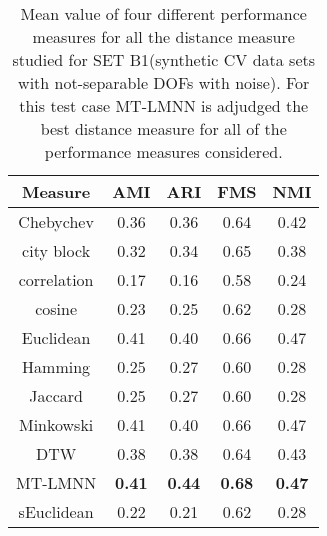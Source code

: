 \begin{table}[h]
\centering
    \begin{tabular}{ |c|c|c|c|c| }
      \hline
    Measure    & 	 AMI &	 ARI &	 FMS &	 NMI \\
    \hline
    Chebychev  &	 0.36 &	 0.36 &	 0.64 &	0.42 \\
    city block  &	 0.32 &	 0.34 &	 0.65 &	0.38 \\
    correlation &	 0.17 &	 0.16 &	 0.58 &	0.24 \\
    cosine   &  	 0.23 &	 0.25 &	 0.62 &	0.28 \\
    Euclidean  &	 0.41 &	 0.40 &	 0.66 &	0.47 \\
    Hamming  &  	 0.25 &	 0.27 &	 0.60 &	0.28 \\
    Jaccard   & 	 0.25 &	 0.27 &	 0.60& 	0.28 \\
    Minkowski & 	 0.41 &	 0.40 &	 0.66& 	0.47 \\
    DTW       & 	 0.38& 	 0.38 &	 0.64 &	0.43 \\
    MT-LMNN   & 	\textbf{ 0.41} &	 \textbf{0.44} &	 \textbf{0.68} &	\textbf{0.47} \\
    sEuclidean &	 0.22 &	 0.21 &	 0.62 &	0.28 \\
    \hline
    \end{tabular}
    \captionsetup{justification=centering}
     \caption{Mean value of four different performance measures for all the distance measure studied for SET B1(synthetic CV data sets with not-separable DOFs with noise). For this test case MT-LMNN is adjudged the best distance measure for all of the performance measures considered.}
     \label{ttest_setb1}
 \end{table}
 
